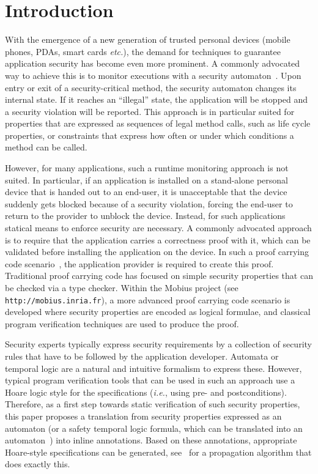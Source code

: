\section{Introduction}\label{SecIntro}

With the emergence of a new generation of trusted personal devices
(mobile phones, PDAs, smart cards \emph{etc.}), the demand for
techniques to guarantee application security has become even more
prominent. A commonly advocated way to achieve this is to monitor
executions with a security automaton~\cite{Schneider99}.  Upon entry
or exit of a security-critical method, the security automaton changes
its internal state. If it reaches an ``illegal'' state, the
application will be stopped and a security violation will be
reported. This approach is in particular suited for properties that
are expressed as sequences of legal method calls, such as life cycle
properties, or constraints that express how often or under which
conditions a method can be called.

However, for many applications, such a runtime monitoring approach is
not suited. In particular, if an application is installed on a
stand-alone personal device that is handed out to an end-user, it is
unacceptable that the device suddenly gets blocked because of a
security violation, forcing the end-user to return to the
provider to unblock the device.  Instead, for such applications
statical means to enforce security are necessary. A commonly advocated
approach is to require that the application carries a correctness
proof with it, which can be validated before installing the application
on the device. In such a proof carrying code scenario~\cite{Necula97},
the application provider is required to create this proof. Traditional
proof carrying code has focused on simple security properties that can
be checked via a type checker. Within the
\textsf{Mobius} project (see \texttt{http://mobius.inria.fr}),
a more advanced proof carrying code scenario is developed where
security properties are encoded as logical formulae, and classical
program verification techniques are used to produce the proof.

Security experts typically express security requirements by a
collection of security rules that have to be followed by the
application developer. Automata or temporal logic are a natural and
intuitive formalism to express these. However, typical program
verification tools that can be used in such an approach use a Hoare
logic style for the specifications (\emph{i.e.}, using pre- and
postconditions). Therefore, as a first step towards static
verification of such security properties, this paper proposes a
translation from security properties expressed as an automaton (or a
safety temporal logic formula, which can be translated into an
automaton~\cite{Wolper01}) into inline annotations. Based on these
annotations, appropriate Hoare-style specifications can be generated,
see~\cite{PavlovaBBHL04} for a propagation algorithm that does exactly
this.


